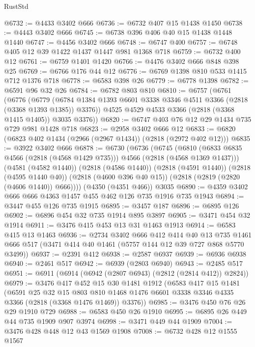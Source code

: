 \begin{lexlean}{RustStd}
\begin{coremodule}
@6732 := @4433 @3402 @666
@6736 := @6732 @407 @15 @1438 @1450
@6738 := @4443 @3402 @666
@6745 := @6738 @396 @406 @40 @15 @1438 @1448 @1440
@6747 := @4456 @3402 @666
@6748 := @6747 @400
@6757 := @6748 @405 @12 @39 @1422 @1437 @1447 @981 @1368 @718
@6759 := @6732 @400 @12
@6761 := @6759 @1401 @1420
@6766 := @4476 @3402 @666 @848 @398 @25
@6769 := @6766 @176 @44 @12
@6776 := @6769 @1398 @810 @533 @1415 @712 @1376 @718
@6778 := @6583 @398 @26
@6779 := @6778 @1398
@6782 := @6591 @96 @32 @26
@6784 := @6782 @803 @810
@6810 := @6757
    (@6761
      (@6776
        (@6779 (@6784 @1384 @1393 @6601 @3338 @3346 @4511 @3366 (@2818 (@3368 @1393 @1385)) @3376))
        @4525
        @4529
        @4533
        @3366
        (@2818 (@3368 @1415 @1405))
        @3035
        @3376))
@6820 := @6747 @403 @76 @12 @29 @1434 @735 @729 @981 @1428 @718
@6823 := @2958 @3402 @666 @12
@6833 := @6820 (@6823 @402 @1434 (@2966 (@2967 @1434)) (@2818 (@2972 @402 @12)))
@6835 := @3922 @3402 @666
@6878 := @6730
    (@6736
      (@6745
        (@6810 (@6833 @6835 @4566 (@2818 (@4568 @1429 @735))) @4566 (@2818 (@4568 @1369 @1437)))
        (@4581 (@4582 @1440))
        (@2818 (@4586 @1440))
        (@2818 (@4591 @1440))
        (@2818 (@4595 @1440 @40))
        (@2818 (@4600 @396 @40 @15))
        (@2818 (@2819 (@2820 (@4606 @1440)) @666))))
    (@4350 (@4351 @466))
    @3035
@6890 := @4359 @3402 @666 @666 @4363 @1457 @455 @462 @126 @735 @1916 @735 @1943
@6894 := @3447 @455 @126 @735 @1915
@6895 := @3457 @187
@6896 := @6895 @126
@6902 := @6896 @454 @32 @735 @1914 @895 @3897
@6905 := @3471 @454 @32 @1914
@6911 := @3476 @415 @453 @13 @31 @1463 @1913
@6914 := @6583 @415 @13 @1463
@6936 := @2734
    @3402
    @666
    @412
    @414
    @40
    @13
    @735
    @1461
    @666
    @517
    (@3471 @414 @40 @1461 (@5757 @144 @12 @39 @727 @868 @5770 @3499))
@6937 := @2391 @412
@6938 := @2587 @6937
@6939 := @6936 @6938
@6940 := @2461 @517
@6942 := @6939 (@2803 @6940)
@6943 := @2485 @517
@6951 := @6911 (@6914 (@6942 (@2807 @6943) (@2812 (@2814 @412)) @2824))
@6979 := @3476
    @417
    @452
    @15
    @30
    @1481
    @1912
    (@6583
      @417
      @15
      @1481
      (@6591
        @25
        @32
        @15
        @803
        @810
        @1468
        @1476
        @6601
        @3338
        @3346
        @4335
        @3366
        (@2818 (@3368 @1476 @1469))
        @3376))
@6985 := @3476 @450 @76 @26 @29 @1910 @729
@6988 := @6583 @450 @26 @1910
@6995 := @6895 @26 @449 @44 @735 @1909 @907 @3974
@6998 := @3471 @449 @44 @1909
@7004 := @3476 @428 @448 @12 @43 @1569 @1908
@7008 := @6732 @428 @12 @1555 @1567

\end{coremodule}
\end{lexlean}
